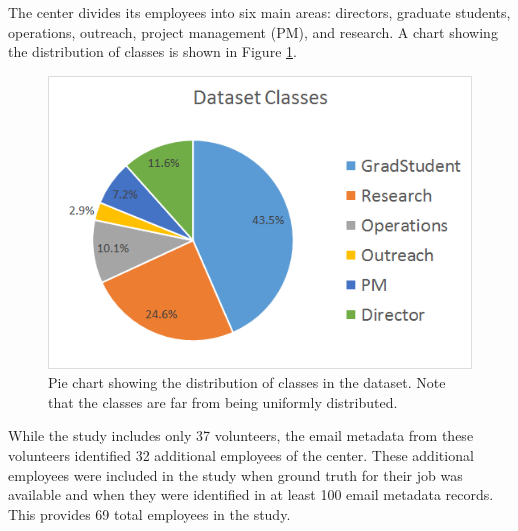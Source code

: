 \documentclass[12pt]{report}
\begin{document}
\begin{table}[t]
\centering
\caption{A comparison between the internal dataset and the Enron email corpus.}
\label{tab:db_stats}
\end{table}

The center divides its employees into six main areas: directors, graduate students, operations, outreach, project management (PM), and research. 
A chart showing the distribution of classes is shown in Figure \ref{fig:class_breakdown}.
\begin{figure}[t]
    \centering
        \includegraphics[width=\columnwidth,trim={1mm 8mm 1mm 2mm},clip]{class_breakdown}
        \caption[Dataset class distribution pie chart]{Pie chart showing the distribution of classes in the dataset.  Note that the classes are far from being uniformly distributed.}
        \label{fig:class_breakdown}
\end{figure}


While the study includes only 37 volunteers, the email metadata from these volunteers identified 32 additional employees of the center.
These additional employees were included in the study when ground truth for their job was available and when they were identified in at least 100 email metadata records.
This provides 69 total employees in the study.
\end{document}
